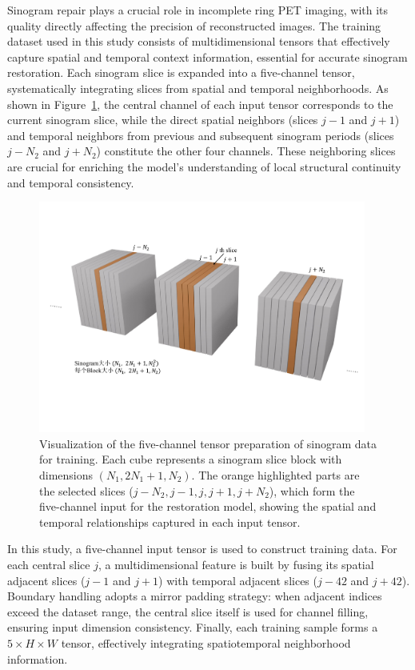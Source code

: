 \documentclass[
reprint,
superscriptaddress,
nofootinbib,
amsmath,amssymb,
aps,
prd,
]{revtex4-2}
\begin{document}
Sinogram repair plays a crucial role in incomplete ring PET imaging, with its quality directly affecting the precision of reconstructed images. The training dataset used in this study consists of multidimensional tensors that effectively capture spatial and temporal context information, essential for accurate sinogram restoration. Each sinogram slice is expanded into a five-channel tensor, systematically integrating slices from spatial and temporal neighborhoods. As shown in Figure~\ref{fig:sinogram_structure}, the central channel of each input tensor corresponds to the current sinogram slice, while the direct spatial neighbors (slices $j-1$ and $j+1$) and temporal neighbors from previous and subsequent sinogram periods (slices $j-N_2$ and $j+N_2$) constitute the other four channels. These neighboring slices are crucial for enriching the model's understanding of local structural continuity and temporal consistency.

\begin{figure}[htbp]
\centering
\vspace{-.3cm}
\includegraphics[width=0.96\textwidth]{Images/fdafads.pdf}
\vspace{-.3cm}
\caption{Visualization of the five-channel tensor preparation of sinogram data for training. Each cube represents a sinogram slice block with dimensions $(N_1, 2N_1+1, N_2)$. The orange highlighted parts are the selected slices ($j-N_2, j-1, j, j+1, j+N_2$), which form the five-channel input for the restoration model, showing the spatial and temporal relationships captured in each input tensor.}
\label{fig:sinogram_structure}
\end{figure}


In this study, a five-channel input tensor is used to construct training data. For each central slice $j$, a multidimensional feature is built by fusing its spatial adjacent slices ($j-1$ and $j+1$) with temporal adjacent slices ($j-42$ and $j+42$). Boundary handling adopts a mirror padding strategy: when adjacent indices exceed the dataset range, the central slice itself is used for channel filling, ensuring input dimension consistency. Finally, each training sample forms a $5\times H\times W$ tensor, effectively integrating spatiotemporal neighborhood information.\par
\end{document}
